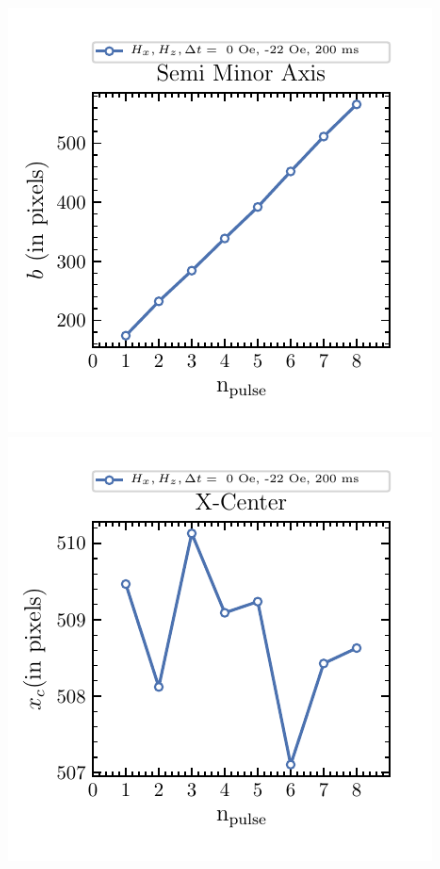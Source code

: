 \documentclass[12pt, twoside, a4paper]{article}
\begin{document}
\begin{figure}[!htbp]
	\includegraphics[scale=1.0]{figures/10_FitsSingleIteration/6__Semi-Minor-Axis.pdf}\\
	\includegraphics[scale=1.0]{figures/10_FitsSingleIteration/6__X-Center.pdf}

\end{figure}
\end{document}
